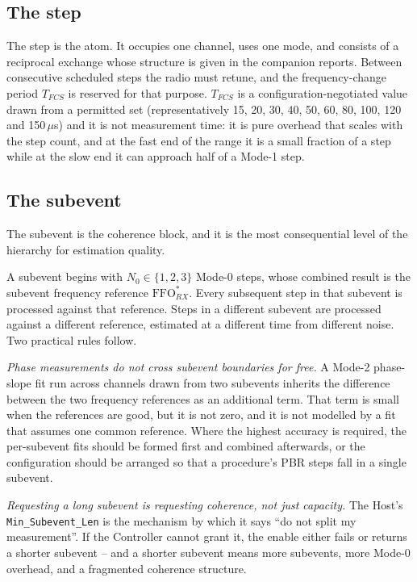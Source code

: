 \documentclass[11pt,a4paper]{article}
\newcommand{\us}{\,\ensuremath{\upmu}s}
\newcommand{\code}[1]{\texttt{\small #1}}
\newcommand{\FFO}{\mathrm{FFO}}
\newcommand{\Tfcs}{T_{FCS}}
\providecommand{\upmu}{\mu}
\begin{document}
\subsection{The step}

The step is the atom. It occupies one channel, uses one mode, and consists of a reciprocal exchange
whose structure is given in the companion reports. Between consecutive scheduled steps the radio must
retune, and the frequency-change period $\Tfcs$ is reserved for that purpose. $\Tfcs$ is a
configuration-negotiated value drawn from a permitted set (representatively 15, 20, 30, 40, 50, 60,
80, 100, 120 and 150\us) and it is not measurement time: it is pure overhead that scales with the
step count, and at the fast end of the range it is a small fraction of a step while at the slow end it
can approach half of a Mode-1 step.

\subsection{The subevent}
\label{sec:hier-coherence}

The subevent is the coherence block, and it is the most consequential level of the hierarchy for
estimation quality.

A subevent begins with $N_0 \in \{1,2,3\}$ Mode-0 steps, whose combined result is the subevent
frequency reference $\FFO^{*}_{RX}$. Every subsequent step in that subevent is processed against that
reference. Steps in a different subevent are processed against a different reference, estimated at a
different time from different noise. Two practical rules follow.

\emph{Phase measurements do not cross subevent boundaries for free.} A Mode-2 phase-slope fit run
across channels drawn from two subevents inherits the difference between the two frequency references
as an additional term. That term is small when the references are good, but it is not zero, and it is
not modelled by a fit that assumes one common reference. Where the highest accuracy is required, the
per-subevent fits should be formed first and combined afterwards, or the configuration should be
arranged so that a procedure's PBR steps fall in a single subevent.

\emph{Requesting a long subevent is requesting coherence, not just capacity.} The Host's
\code{Min\_Subevent\_Len} is the mechanism by which it says ``do not split my measurement''. If the
Controller cannot grant it, the enable either fails or returns a shorter subevent -- and a shorter
subevent means more subevents, more Mode-0 overhead, and a fragmented coherence structure.
\end{document}
